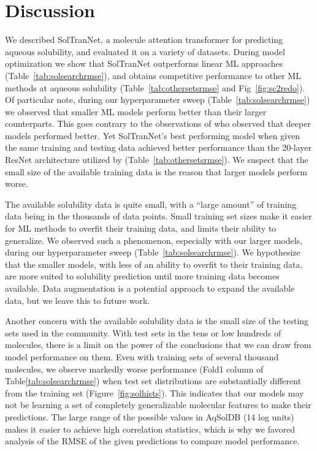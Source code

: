 \documentclass[journal=jmcmar,manuscript=article]{achemso}
\begin{document}
\section{Discussion}

We described SolTranNet, a molecule attention transformer for predicting aqueous solubility, and evaluated it on a variety of datasets.
During model optimization we show that SolTranNet outperforms linear ML approaches (Table~\ref{tab:solsearchrmse}), and obtains competitive performance to other ML methods at aqueous solubility (Table~\ref{tab:othersetsrmse} and Fig~\ref{fig:sc2redo}).
Of particular note, during our hyperparameter sweep (Table~\ref{tab:solsearchrmse}) we observed that smaller ML models perform better than their larger counterparts.
This goes contrary to the observations of \citet{cui} who observed that deeper models performed better.
Yet SolTranNet's best performing model when given the same training and testing data achieved better performance than the 20-layer ResNet architecture utilized by \citet{cui} (Table~\ref{tab:othersetsrmse}).
We suspect that the small size of the available training data is the reason that larger models perform worse.

The available solubility data is quite small, with a ``large amount'' of training data being in the thousands of data points.
Small training set sizes make it easier for ML methods to overfit their training data, and limits their ability to generalize.
We observed such a phenomenon, especially with our larger models, during our hyperparameter sweep (Table~\ref{tab:solsearchrmse}).
We hypothesize that the smaller models, with less of an ability to overfit to their training data, are more suited to solubility prediction until more training data becomes available.
Data augmentation is a potential approach to expand the available data, but we leave this to future work.

Another concern with the available solubility data is the small size of the testing sets used in the community.
With test sets in the tens or low hundreds of molecules, there is a limit on the power of the conclusions that we can draw from model performance on them.
Even with training sets of several thousand molecules, we observe markedly worse performance (Fold1 column of Table\ref{tab:solsearchrmse}) when test set distributions are substantially different from the training set (Figure~\ref{fig:solhists}).
This indicates that our models may not be learning a set of completely generalizable molecular features to make their predictions.
The large range of the possible values in AqSolDB (14 log units) makes it easier to achieve high correlation statistics, which is why we favored analysis of the RMSE of the given predictions to compare model performance.
\end{document}
